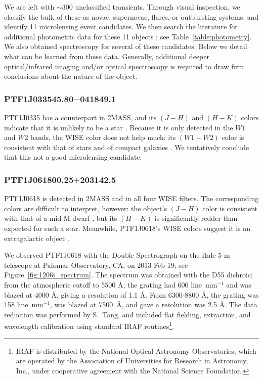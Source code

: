 \documentclass{emulateapj}
\begin{document}
We are left with $\sim$300 unclassified transients. Through visual inspection, we classify the bulk of these as novae, supernovae, flares, or outbursting systems, and identify 11 microlensing event candidates. We then search the literature for additional photometric data for these 11 objects \citep[2MASS,WISE;][]{cutri03,WISE}; see Table~\ref{table:photometry}. We also obtained spectroscopy for several of these candidates. Below we detail what can be learned from these data. Generally, additional deeper optical/infrared imaging and/or optical spectroscopy is required to draw firm conclusions about the nature of the object.

\subsubsection*{PTF1J033545.80$-$041849.1} %
PTF1J0335 has a counterpart in 2MASS, and its $(J-H)$ and $(H-K)$ colors indicate that it is unlikely to be a star \citep{kev07}. Because it is only detected in the $W1$ and $W2$ bands, the WISE color does not help much: its $(W1-W2)$ color is consistent with that of stars and of compact galaxies \citep[cf.\ Figure 14 in][]{yan2013}. We tentatively conclude that this not a good microlensing candidate. 

\subsubsection*{PTF1J061800.25$+$203142.5} %
PTF1J0618 is detected in 2MASS and in all four WISE filters. The corresponding colors are difficult to interpret, however: the object's $(J-H)$ color is consistent with that of a mid-M dwarf \citep{kev07}, but its $(H-K)$ is significantly redder than expected for such a star. Meanwhile, PTF1J0618's WISE colors suggest it is an extragalactic object \citep[cf.\ Figure 14 in][]{yan2013}.

We observed PTF1J0618 with the Double Spectrograph \citep[DBSP;][]{oke_gunn} on the Hale 5-m telescope at Palomar Observatory, CA, on 2013 Feb 19; see Figure~\ref{fig:1206i_spectrum}. The spectrum was obtained with the D55 dichroic; from the atmospheric cutoff to 5500 \AA, the grating had 600 line~mm$^{-1}$ and was blazed at 4000 \AA, giving a resolution of 1.1 \AA. From 6300-8800 \AA, the grating was 158 line~mm$^{-1}$, was blazed at 7500\ \AA, and gave a resolution was 2.5 \AA. The data reduction was performed by S.~Tang, and included flat fielding, extraction, and wavelength calibration using standard IRAF routines\footnote{IRAF is distributed by the National Optical Astronomy Observatories, which are operated by the Association of Universities for Research in Astronomy, Inc., under cooperative agreement with the National Science Foundation.}.
\end{document}
